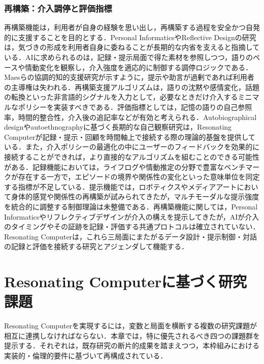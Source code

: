 \documentclass[originalpaper]{jsaiart}
\begin{document}
\subsubsection{再構築：介入調停と評価指標}
再構築機能は，利用者が自身の経験を思い出し，再構築する過程を安全かつ自発的に支援することを目的とする．Personal InformaticsやReflective Designの研究は，気づきの形成を利用者自身に委ねることが長期的な内省を支えると指摘している\cite{li2010,epstein2015}．AIに求められるのは，記録・提示局面で得た素材を参照しつつ，語りのペースや情動変化を観察し，介入強度を適応的に制御する調停ロジックである．Maesらの協調的知的支援研究\cite{maes1994}が示すように，提示や助言が過剰であれば利用者の主導権は失われる．再構築支援アルゴリズムは，語りの沈黙や感情変化，話題の転換といった非言語的シグナルを入力として，必要なときだけ介入するミニマルなポリシーを実装すべきである．評価指標としては，記憶の語りの自己参照率，時間的整合性，介入後の追記率などが有効と考えられる．Autobiographical designやautoethnographyに基づく長期的な自己観察研究\cite{li2010,epstein2015,karkar2017}は，Resonating Computerが記録・提示・回顧を時間軸上で接続する際の理論的基盤を提供している．また，介入ポリシーの最適化の中にユーザーのフィードバックを効果的に接続することができれば，より直接的なアルゴリズムを組むことのできる可能性がある\cite{amershi2019}．記録機能においては，ライフログや情動推定の分野で豊富なベンチマークが存在する一方で，エピソードの境界や関係性の変化といった意味単位を同定する指標が不足している．提示機能では，ロボティクス\cite{ishiguro2012}やメディアアート\cite{Hirakawa_2015}において身体的感覚や関係性の再構築が試みられてきたが，マルチモーダルな提示強度を統合的に調整する制御理論は未整備である．再構築機能に関しては，Personal Informaticsやリフレクティブデザインが介入の構えを提示してきたが，AIが介入のタイミングやその証跡を記録・評価する共通プロトコルは確立されていない．Resonating Computerは，これら三局面にまたがるデータ設計・提示制御・対話の記録と評価を接続する研究とアジェンダして機能する．

\section{Resonating Computerに基づく研究課題}\label{sec:agenda}
Resonating Computerを実現するには，変数と局面を横断する複数の研究課題が相互に連携しなければならない．本章では，特に優先されるべき四つの課題群を提示する．それぞれは，既存研究の断片的成果を踏まえつつ，本枠組みにおける実装的・倫理的要件に基づいて再構成されている．
\end{document}
